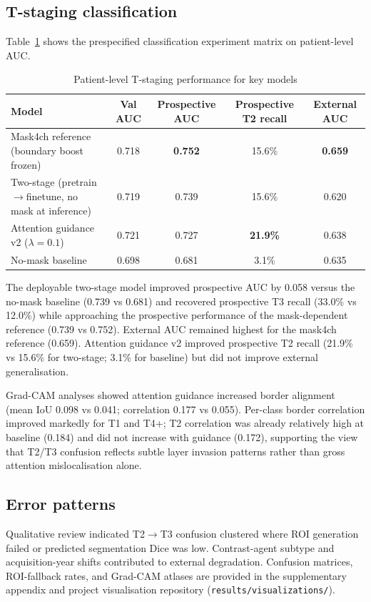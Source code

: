 \documentclass[11pt,a4paper]{article}
\begin{document}
\subsection{T-staging classification}
Table~\ref{tab:classification} shows the prespecified classification experiment matrix on patient-level AUC.

\begin{table}[htbp]
\centering
\caption{Patient-level T-staging performance for key models}
\label{tab:classification}
\begin{tabular}{lcccc}
\toprule
Model & Val AUC & Prospective AUC & Prospective T2 recall & External AUC \\
\midrule
Mask4ch reference (boundary boost frozen) & 0.718 & \textbf{0.752} & 15.6\% & \textbf{0.659} \\
Two-stage (pretrain$\rightarrow$finetune, no mask at inference) & 0.719 & 0.739 & 15.6\% & 0.620 \\
Attention guidance v2 ($\lambda{=}0.1$) & 0.721 & 0.727 & \textbf{21.9\%} & 0.638 \\
No-mask baseline & 0.698 & 0.681 & 3.1\% & 0.635 \\
\bottomrule
\end{tabular}
\end{table}

The deployable two-stage model improved prospective AUC by 0.058 versus the no-mask baseline (0.739 vs 0.681) and recovered prospective T3 recall (33.0\% vs 12.0\%) while approaching the prospective performance of the mask-dependent reference (0.739 vs 0.752). External AUC remained highest for the mask4ch reference (0.659). Attention guidance v2 improved prospective T2 recall (21.9\% vs 15.6\% for two-stage; 3.1\% for baseline) but did not improve external generalisation.

Grad-CAM analyses showed attention guidance increased border alignment (mean IoU 0.098 vs 0.041; correlation 0.177 vs 0.055). Per-class border correlation improved markedly for T1 and T4+; T2 correlation was already relatively high at baseline (0.184) and did not increase with guidance (0.172), supporting the view that T2/T3 confusion reflects subtle layer invasion patterns rather than gross attention mislocalisation alone.

\subsection{Error patterns}
Qualitative review indicated T2$\rightarrow$T3 confusion clustered where ROI generation failed or predicted segmentation Dice was low. Contrast-agent subtype and acquisition-year shifts contributed to external degradation. Confusion matrices, ROI-fallback rates, and Grad-CAM atlases are provided in the supplementary appendix and project visualisation repository (\texttt{results/visualizations/}).
\end{document}
